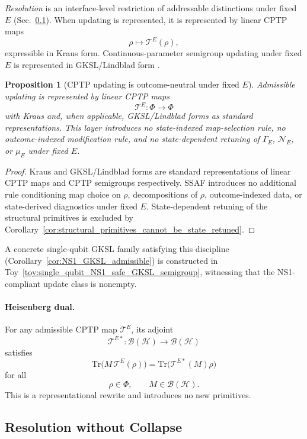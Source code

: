 \documentclass[aps,prx,onecolumn,11pt]{revtex4-2}
\theoremstyle{plain}
\newtheorem{proposition}{Proposition}
\theoremstyle{definition}
\theoremstyle{remark}
\begin{document}
\emph{Resolution} is an interface-level restriction of addressable
distinctions under fixed \(E\)
(Sec.~\ref{subsec:resolution_without_collapse}). When updating is
represented, it is represented by linear CPTP maps
\[
\rho\mapsto\mathcal{T}^E(\rho),
\]
expressible in Kraus form. Continuous-parameter semigroup updating under
fixed \(E\) is represented in GKSL/Lindblad form
\cite{Kraus1983,Lindblad1976,Gorini1976}.

\begin{proposition}[CPTP updating is outcome-neutral under fixed \(E\)]
\label{prop:cptp_outcome_neutral}
Admissible updating is represented by linear CPTP maps
\[
\mathcal{T}^E:\Phi\to\Phi
\]
with Kraus and, when applicable, GKSL/Lindblad forms as standard
representations. This layer introduces no state-indexed map-selection
rule, no outcome-indexed modification rule, and no state-dependent
retuning of \(\Gamma_E\), \(\mathcal N_E\), or \(\mu_E\) under fixed
\(E\).
\end{proposition}

\begin{proof}
Kraus and GKSL/Lindblad forms are standard representations of linear
CPTP maps and CPTP semigroups respectively. SSAF introduces no
additional rule conditioning map choice on \(\rho\), decompositions of
\(\rho\), outcome-indexed data, or state-derived diagnostics under fixed
\(E\). State-dependent retuning of the structural primitives is
excluded by
Corollary~\ref{cor:structural_primitives_cannot_be_state_retuned}.
\end{proof}

A concrete single-qubit GKSL family satisfying this discipline
(Corollary~\ref{cor:NS1_GKSL_admissible}) is constructed in
Toy~\ref{toy:single_qubit_NS1_safe_GKSL_semigroup},
witnessing that the NS1-compliant update class is nonempty.

\paragraph{Heisenberg dual.}

For any admissible CPTP map \(\mathcal{T}^E\), its adjoint
\[
\mathcal{T}^{E*}:\mathcal{B}(\mathcal{H})\to\mathcal{B}(\mathcal{H})
\]
satisfies
\[
\mathrm{Tr}\bigl(M\,\mathcal{T}^E(\rho)\bigr)
=
\mathrm{Tr}\bigl(\mathcal{T}^{E*}(M)\rho\bigr)
\]
for all
\[
\rho\in\Phi,
\qquad
M\in\mathcal{B}(\mathcal{H}).
\]
This is a representational rewrite and introduces no new primitives.

\subsection{Resolution without Collapse}
\label{subsec:resolution_without_collapse}
\end{document}
